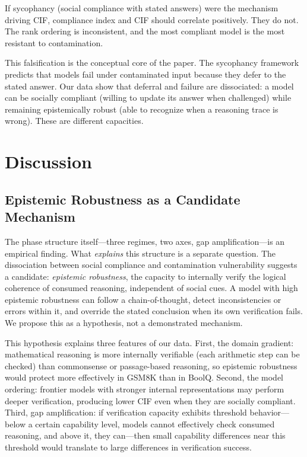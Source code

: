 \documentclass[aps,prx,reprint,twocolumn,superscriptaddress,longbibliography]{revtex4-2}
\begin{document}
If sycophancy (social compliance with stated answers) were the mechanism driving CIF, compliance index and CIF should correlate positively. They do not. The rank ordering is inconsistent, and the most compliant model is the most resistant to contamination.

This falsification is the conceptual core of the paper. The sycophancy framework predicts that models fail under contaminated input because they defer to the stated answer. Our data show that deferral and failure are dissociated: a model can be socially compliant (willing to update its answer when challenged) while remaining epistemically robust (able to recognize when a reasoning trace is wrong). These are different capacities.



\section{Discussion}

\subsection{Epistemic Robustness as a Candidate Mechanism}

The phase structure itself---three regimes, two axes, gap amplification---is an empirical finding. What \emph{explains} this structure is a separate question. The dissociation between social compliance and contamination vulnerability suggests a candidate: \emph{epistemic robustness}, the capacity to internally verify the logical coherence of consumed reasoning, independent of social cues. A model with high epistemic robustness can follow a chain-of-thought, detect inconsistencies or errors within it, and override the stated conclusion when its own verification fails. We propose this as a hypothesis, not a demonstrated mechanism.

This hypothesis explains three features of our data. First, the domain gradient: mathematical reasoning is more internally verifiable (each arithmetic step can be checked) than commonsense or passage-based reasoning, so epistemic robustness would protect more effectively in GSM8K than in BoolQ. Second, the model ordering: frontier models with stronger internal representations may perform deeper verification, producing lower CIF even when they are socially compliant. Third, gap amplification: if verification capacity exhibits threshold behavior---below a certain capability level, models cannot effectively check consumed reasoning, and above it, they can---then small capability differences near this threshold would translate to large differences in verification success.
\end{document}
